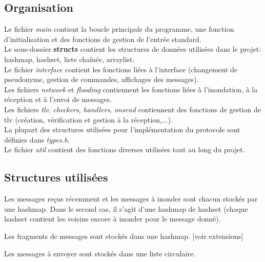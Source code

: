\documentclass[a4paper,10pt]{article} %
\begin{document}
\subsection{Organisation}
Le fichier \textit{main} contient la boucle principale du programme, une fonction d'initialisation et des fonctions de gestion de l'entrée standard.\\

Le sous-dossier \textbf{structs} contient les structures de données utilisées dans le projet: hashmap, hashset, liste chaînée, arraylist.\\

Le fichier \textit{interface} contient les fonctions liées à l'interface (changement de pseudonyme, gestion de commandes, affichages des messages).\\

Les fichiers \textit{network} et \textit{flooding} contiennent les fonctions liées à l'inondation, à la réception et à l'envoi de messages.\\

Les fichiers \textit{tlv}, \textit{checkers}, \textit{handlers}, \textit{onsend} contiennent des fonctions de gestion de tlv (création, vérification et gestion à la réception,...).\\

La plupart des structures utilisées pour l'implémentation du protocole sont définies dans \textit{types.h}.\\

Le fichier \textit{util} contient des fonctions diverses utilisées tout au long du projet.

\subsection{Structures utilisées}
Les messages reçus récemment et les messages à inonder sont chacun stockés par une hashmap. Dans le second cas, il s'agit d'une hashmap de hashset (chaque hashset contient les voisins encore à inonder pour le message donné).

Les fragments de messages sont stockés dans une hashmap. [voir extensions]

Les messages à envoyer sont stockés dans une liste circulaire.
\end{document}
